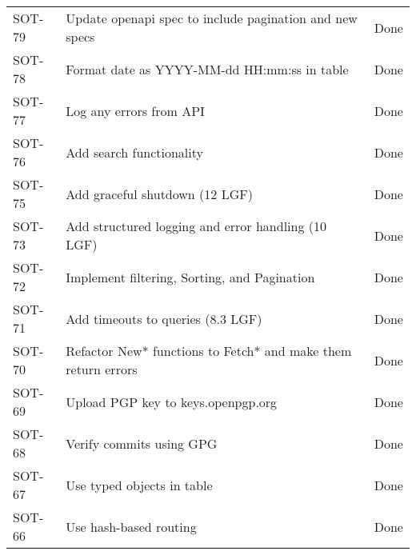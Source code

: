 \documentclass[dutch]{article}
\begin{document}
\begin{longtable}{@{}lp{6cm}l@{}}
    SOT-79             & Update openapi spec to include pagination and new specs                                                                   & Done            \\
    SOT-78             & Format date as YYYY-MM-dd HH:mm:ss in table                                                                               & Done            \\
    SOT-77             & Log any errors from API                                                                                                   & Done            \\
    SOT-76             & Add search functionality                                                                                                  & Done            \\
    SOT-75             & Add graceful shutdown (12 LGF)                                                                                            & Done            \\
    SOT-73             & Add structured logging and error handling (10 LGF)                                                                        & Done            \\
    SOT-72             & Implement filtering, Sorting, and Pagination                                                                              & Done            \\
    SOT-71             & Add timeouts to queries (8.3 LGF)                                                                                         & Done            \\
    SOT-70             & Refactor New* functions to Fetch* and make them return errors                                                             & Done            \\
    SOT-69             & Upload PGP key to keys.openpgp.org                                                                                        & Done            \\
    SOT-68             & Verify commits using GPG                                                                                                  & Done            \\
    SOT-67             & Use typed objects in table                                                                                                & Done            \\
    SOT-66             & Use hash-based routing                                                                                                    & Done            \\

\end{longtable}
\end{document}
